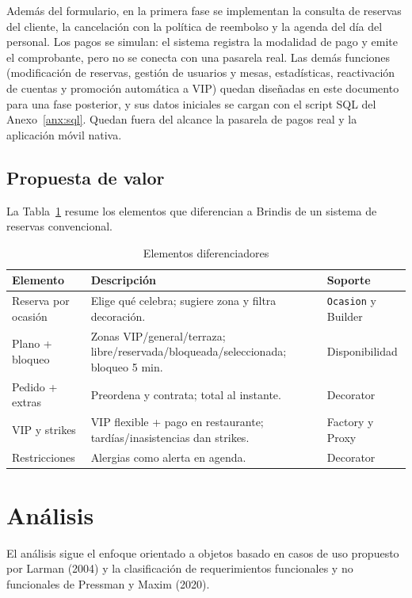 \documentclass[12pt]{article}
\begin{document}
Además del formulario, en la primera fase se implementan la consulta de reservas del cliente, la cancelación con la política de reembolso y la agenda del día del personal. Los pagos se simulan: el sistema registra la modalidad de pago y emite el comprobante, pero no se conecta con una pasarela real. Las demás funciones (modificación de reservas, gestión de usuarios y mesas, estadísticas, reactivación de cuentas y promoción automática a VIP) quedan diseñadas en este documento para una fase posterior, y sus datos iniciales se cargan con el script SQL del Anexo~\ref{anx:sql}. Quedan fuera del alcance la pasarela de pagos real y la aplicación móvil nativa.
\subsection{Propuesta de valor}
La Tabla~\ref{tab:valor} resume los elementos que diferencian a Brindis de un sistema de reservas convencional.
\begin{table}[h]\centering\caption{Elementos diferenciadores}\label{tab:valor}
\begin{tabular}{>{\raggedright\arraybackslash}p{3cm}>{\raggedright\arraybackslash}p{7cm}>{\raggedright\arraybackslash}p{3cm}}\toprule
Elemento & Descripción & Soporte\\\midrule
Reserva por ocasión & Elige qué celebra; sugiere zona y filtra decoración. & \texttt{Ocasion} y Builder\\
Plano + bloqueo & Zonas VIP/general/terraza; libre/reservada/bloqueada/seleccionada; bloqueo 5 min. & Disponibilidad\\
Pedido + extras & Preordena y contrata; total al instante. & Decorator\\
VIP y strikes & VIP flexible + pago en restaurante; tardías/inasistencias dan strikes. & Factory y Proxy\\
Restricciones & Alergias como alerta en agenda. & Decorator\\\bottomrule
\end{tabular}
\end{table}

\section{Análisis}
El análisis sigue el enfoque orientado a objetos basado en casos de uso propuesto por Larman (2004) y la clasificación de requerimientos funcionales y no funcionales de Pressman y Maxim (2020).
\end{document}
